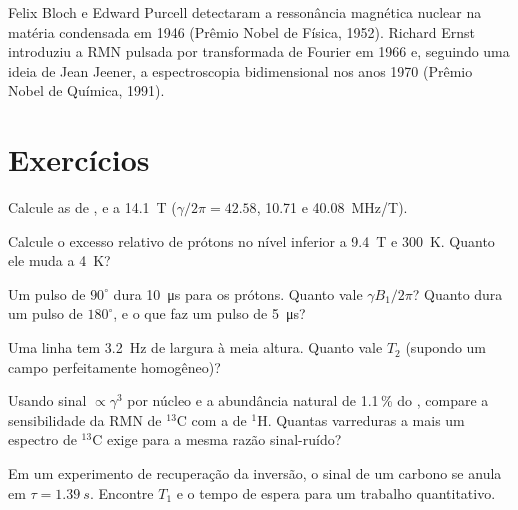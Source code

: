\begin{history}
Felix Bloch e Edward Purcell detectaram a ressonância magnética nuclear na
matéria condensada em 1946 (Prêmio Nobel de Física, 1952). Richard Ernst
introduziu a RMN pulsada por transformada de Fourier em 1966 e, seguindo uma
ideia de Jean Jeener, a espectroscopia bidimensional nos anos 1970 (Prêmio
Nobel de Química, 1991).
\end{history}

\section{Exercícios}

\begin{exercise}[$\star$]\label{exo:b3:advanced-nmr:1}
Calcule as  de ,  e  a \qty{14.1}{T}
($\gamma/2\pi = 42.58$, 10.71 e \qty{40.08}{MHz/T}).
\end{exercise}

\begin{exercise}[$\star$]\label{exo:b3:advanced-nmr:2}
Calcule o excesso relativo de prótons no nível inferior a \qty{9.4}{T} e
\qty{300}{K}. Quanto ele muda a \qty{4}{K}?
\end{exercise}

\begin{exercise}[$\star$]\label{exo:b3:advanced-nmr:3}
Um pulso de $90^\circ$ dura \qty{10}{\micro s} para os prótons. Quanto vale $\gamma B_1/2\pi$? Quanto
dura um pulso de $180^\circ$, e o que faz um pulso de \qty{5}{\micro s}?
\end{exercise}

\begin{exercise}[$\star$]\label{exo:b3:advanced-nmr:4}
Uma linha tem \qty{3.2}{Hz} de largura à meia altura. Quanto vale $T_2$ (supondo um
campo perfeitamente homogêneo)?
\end{exercise}

\begin{exercise}[$\star\star$]\label{exo:b3:advanced-nmr:5}
Usando sinal $\propto\gamma^3$ por núcleo e a abundância natural de 1.1\,\% do
, compare a sensibilidade da RMN de ${}^{13}$C com a de ${}^1$H. Quantas
varreduras a mais um espectro de ${}^{13}$C exige para a mesma razão sinal-ruído?
\end{exercise}

\begin{exercise}[$\star\star$]\label{exo:b3:advanced-nmr:6}
Em um experimento de recuperação da inversão, o sinal de um carbono se anula em
$\tau = \qty{1.39}{s}$. Encontre $T_1$ e o tempo de espera para um trabalho quantitativo.
\end{exercise}

